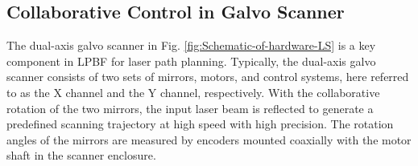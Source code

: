 \documentclass [11pt, proquest] {uwthesis}[2020/02/24]
\begin{document}
\subsection{Collaborative Control in Galvo Scanner} \label{subsec:Collaborative-control-galvo-scanner}

The dual-axis galvo scanner in Fig. \ref{fig:Schematic-of-hardware-LS} is a
key component in LPBF for laser path planning. Typically, the dual-axis
galvo scanner consists of two sets of mirrors, motors, and control
systems, here referred to as the X channel and the Y channel, respectively.
With the collaborative rotation of the two mirrors, the input laser
beam is reflected to generate a predefined scanning trajectory at
high speed with high precision. The rotation angles of the mirrors
are measured by encoders mounted coaxially with the motor shaft in
the scanner enclosure.
\end{document}
